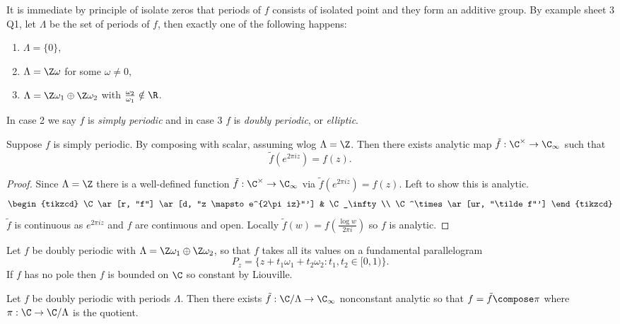 \documentclass[a4paper]{article}
\begin{document}
It is immediate by principle of isolate zeros that periods of \(f\) consists of isolated point and they form an additive group. By example sheet 3 Q1, let \(\Lambda\) be the set of periods of \(f\), then exactly one of the following happens:
\begin{enumerate}
\item \(\Lambda = \{0\}\),
\item \(\Lambda = \Z\omega\) for some \(\omega \neq 0\),
\item \(\Lambda = \Z\omega_1 \oplus \Z\omega_2\) with \(\frac{\omega_2}{\omega_1} \notin \R\).
\end{enumerate}
In case 2 we say \(f\) is \emph{simply periodic} and in case 3 \(f\) is \emph{doubly periodic}, or \emph{elliptic}.

\begin{proposition}
  Suppose \(f\) is simply periodic. By composing with scalar, assuming wlog \(\Lambda = \Z\). Then there exists analytic map \(\tilde f: \C^\times \to \C_\infty\) such that
  \[
    \tilde f(e^{2\pi i z}) = f(z).
  \]
\end{proposition}

\begin{proof}
  Since \(\Lambda = \Z\) there is a well-defined function \(\tilde f: \C^\times \to \C_\infty\) via \(\tilde f(e^{2\pi i z}) = f(z)\). Left to show this is analytic.
  \[
    \begin{tikzcd}
      \C \ar[r, "f"] \ar[d, "z \mapsto e^{2\pi iz}"'] & \C_\infty \\
      \C^\times \ar[ur, "\tilde f"']
    \end{tikzcd}
  \]
  \(\tilde f\) is continuous as \(e^{2\pi iz}\) and \(f\) are continuous and open. Locally \(\tilde f(w) = f(\frac{\log w}{2\pi i})\) so \(f\) is analytic.
\end{proof}

Let \(f\) be doubly periodic with \(\Lambda = \Z\omega_1 \oplus \Z\omega_2\), so that \(f\) takes all its values on a fundamental parallelogram
\[
  P_z = \{z + t_1\omega_1 + t_2\omega_2: t_1, t_2 \in [0, 1)\}.
\]
If \(f\) has no pole then \(f\) is bounded on \(\C\) so constant by Liouville.

\begin{proposition}
  Let \(f\) be doubly periodic with periods \(\Lambda\). Then there exists \(\tilde f: \C/\Lambda \to \C_\infty\) nonconstant analytic so that \(f = \tilde f \compose \pi\) where \(\pi: \C \to \C / \Lambda\) is the quotient.
\end{proposition}
\end{document}
